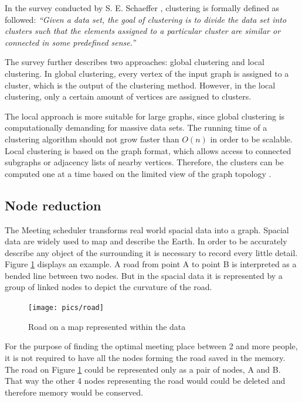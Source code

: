 \documentclass[thesis=M,english]{FITthesis}[2012/10/20]
\begin{document}
In the survey conducted by S. E. Schaeffer \cite{Schaeffer07}, clustering is formally defined as followed: \textit{``Given a data set, the goal of clustering is to divide the data set into clusters such that the elements assigned to a particular cluster are similar or connected in some predefined sense.''}

The survey further describes two approaches: global clustering and local clustering. In global clustering, every vertex of the input graph is assigned to a cluster, which is the output of the clustering method. However, in the local clustering, only a certain amount of vertices are assigned to clusters. 

The local approach is more suitable for large graphs, since global clustering is computationally demanding for massive data sets. The running time of a clustering algorithm should not grow faster than $O(n)$ in order to be scalable. Local clustering is based on the graph format, which allows access to connected subgraphs or adjacency lists of nearby vertices. Therefore, the clusters can be computed one at a time based on the limited view of the graph topology \cite{Schaeffer07}.




\subsection{Node reduction}
\label{sec:NodeReduction}
The Meeting scheduler transforms real world spacial data into a graph. Spacial data are widely used to map and describe the Earth. In order to be accurately describe any object of the surrounding it is necessary to record every little detail. Figure \ref{pic:Road} displays an example. A road from point A to point B is interpreted as a bended line between two nodes. But in the spacial data it is represented by a group of linked nodes to depict the curvature of the road.

\begin{figure}[H]
\centering
\texttt{[image: pics/road]}
\caption{Road on a map represented within the data}
\label{pic:Road}
\end{figure}

For the purpose of finding the optimal meeting place between 2 and more people, it is not required to have all the nodes forming the road saved in the memory. The road on Figure \ref{pic:Road} could be represented only as a pair of nodes, A and B. That way the other 4 nodes representing the road would could be deleted and therefore memory would be conserved. 
\end{document}
